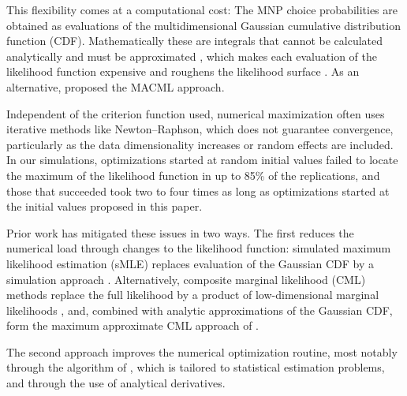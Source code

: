\documentclass[preprint,12pt,authoryear]{elsarticle}
\begin{document}
This flexibility comes at a computational cost: The MNP choice probabilities are obtained as evaluations of the multidimensional Gaussian cumulative distribution function (CDF). Mathematically these are integrals that cannot be calculated analytically and must be approximated \citep[Chapter 5]{Train2009}, which makes each evaluation of the likelihood function expensive and roughens the likelihood surface \citep{Batram2023}. As an alternative,
\citet{Bhat2011} proposed the MACML approach.

Independent of the criterion function used, numerical maximization often uses iterative methods like Newton--Raphson, which
does not guarantee convergence, particularly as the data dimensionality increases or random effects are included. In our simulations, optimizations started at random initial values failed to locate the maximum of the likelihood function in up to 85\% of the replications, and those that succeeded took two to four times as long as optimizations started at the initial values proposed in this paper.

Prior work has mitigated these issues in two ways. The first reduces the numerical load through changes to the likelihood function: simulated maximum likelihood estimation (sMLE) replaces evaluation of the Gaussian CDF
by a simulation approach \citep{Train2009}. Alternatively,
composite marginal likelihood (CML) methods replace the full likelihood by a product of low-dimensional marginal likelihoods \citep{Varin2008}, and, combined with analytic approximations of the Gaussian CDF, form the maximum approximate CML approach of \citet{Bhat2011}.

The second approach improves the numerical optimization routine, most notably through the algorithm of \citet{Bunch1993}, which is tailored to statistical estimation problems, and through the use of analytical derivatives.
\end{document}
